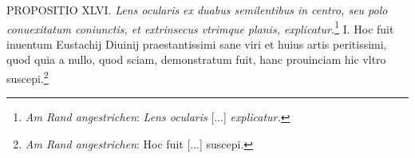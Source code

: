  \pend \vspace{3.0ex}\pstart \centering [p.~131] PROPOSITIO XLVI. \pend \vspace{1.0ex} \pstart \textit{Lens ocularis}\protect{}\textit{ ex duabus semilentibus in centro, seu polo conuexitatum coniunctis, et extrinsecus vtrimque planis, explicatur.}\footnote{\textit{Am Rand angestrichen}: \textit{Lens\protect{} ocularis\protect{}} [...] \textit{explicatur.}} I. Hoc fuit inuentum Eustachij Diuinij praestantissimi sane viri et huius artis peritissimi, quod quia a nullo, quod sciam, demonstratum fuit, hanc prouinciam hic vltro suscepi.\footnote{\textit{Am Rand angestrichen}: Hoc fuit [...] suscepi.}